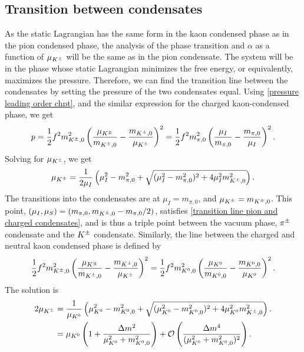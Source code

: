 \subsection{Transition between condensates}


As the static Lagrangian has the same form in the kaon condensed phase as in the pion condensed phase, the analysis of the phase transition and $\alpha$ as a function of $\mu_{K^\pm}$ will be the same as in the pion condensate.
The system will be in the phase whose static Lagrangian minimizes the free energy, or equivalently, maximizes the pressure.
Therefore, we can find the transition line between the condensates by setting the pressure of the two condensates equal.
Using \autoref{pressure leading order chpt}, and the similar expression for the charged kaon-condensed phase, we get
%
\begin{equation}
    p 
    = \frac{1}{2} f^2 m_{{K^\pm},0}^2 \left( \frac{\mu_{K^\pm}}{m_{{K^\pm},0}} - \frac{m_{{K^\pm},0}}{\mu_{K^\pm}} \right)^2
    =
    \frac{1}{2} f^2m_{\pi,0}^2  \left( \frac{\mu_I}{m_{\pi,0}} - \frac{m_{\pi,0}}{\mu_I} \right)^2.
\end{equation}
%
Solving for $\mu_{K^\pm}$, we get
%
\begin{equation}
    \label{transition line pion and charged condensates}
    \mu_{K^\pm} =\frac{1}{2\mu_I} \left(\mu_I^2 - m_{\pi,0}^2  + \sqrt{(\mu_I^2 - m_{\pi,0}^2)^2 + 4\mu_I^2 m_{{K^\pm},0}^2}\right).
\end{equation}
%
The transitions into the condensates are at $\mu_I = m_{\pi,0}$, and $\mu_{K^\pm} = m_{{K^\pm},0}$.
This point, $(\mu_I, \mu_S) = (m_{\pi,0}, m_{{K^\pm},0} - m_{\pi,0}/2)$, satisfies \autoref{transition line pion and charged condensates}, and is thus a triple point between the vacuum phase, ${\pi^\pm}$ condensate and the ${K^\pm}$ condensate. 
Similarly, the line between the charged and neutral kaon condensed phase is defined by
%
\begin{equation}
    \frac{1}{2} f^2 m_{{K^\pm},0}^2 \left( \frac{\mu_{K^\pm}}{m_{{K^\pm},0}} - \frac{m_{{K^\pm},0}}{\mu_{K^\pm}} \right)^2
    =
    \frac{1}{2} f^2 m_{{K^0},0}^2 \left( \frac{\mu_{K^0}}{m_{{K^0},0}} - \frac{m_{{K^0},0}}{\mu_{K^0}} \right)^2.
\end{equation}
%
The solution is
% 
\begin{align}
    \nonumber
    2 \mu_{K^\pm} 
    &= \frac{1}{\mu_{K^0}}
    \left(
        \mu_{K^0}^2 - m_{{K^0},0}^2  + \sqrt{(\mu_{K^0}^2 - m_{{K^0},0}^2)^2 + 4\mu_{K^0}^2m_{{K^\pm},0}^2}
    \right).
    \\
    &= \mu_{K^0} \left(1 + \frac{\Delta m^2}{\mu_{K^0}^2 + m_{{K^0},0}^2}\right)
    + \mathcal O\left( \frac{\Delta m^4}{ (\mu_{K^0}^2 + m_{{K^0},0}^2)^2} \right).
\end{align}
